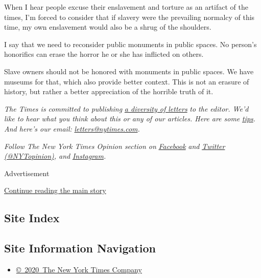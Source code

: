 When I hear people excuse their enslavement and torture as an artifact
of the times, I'm forced to consider that if slavery were the prevailing
normalcy of this time, my own enslavement would also be a shrug of the
shoulders.

I say that we need to reconsider public monuments in public spaces. No
person's honorifics can erase the horror he or she has inflicted on
others.

Slave owners should not be honored with monuments in public spaces. We
have museums for that, which also provide better context. This is not an
erasure of history, but rather a better appreciation of the horrible
truth of it.

\emph{The Times is committed to publishing}
\href{https://www.nytimes.com/2019/01/31/opinion/letters/letters-to-editor-new-york-times-women.html}{\emph{a
diversity of letters}} \emph{to the editor. We'd like to hear what you
think about this or any of our articles. Here are some}
\href{https://help.nytimes.com/hc/en-us/articles/115014925288-How-to-submit-a-letter-to-the-editor}{\emph{tips}}\emph{.
And here's our email:}
\href{mailto:letters@nytimes.com}{\emph{letters@nytimes.com}}\emph{.}

\emph{Follow The New York Times Opinion section on}
\href{https://www.facebook.com/nytopinion}{\emph{Facebook}} \emph{and}
\href{http://twitter.com/NYTOpinion}{\emph{Twitter
(@NYTopinion)}}\emph{, and}
\href{https://www.instagram.com/nytopinion/}{\emph{Instagram}}\emph{.}

Advertisement

\protect\hyperlink{after-bottom}{Continue reading the main story}

\hypertarget{site-index}{%
\subsection{Site Index}\label{site-index}}

\hypertarget{site-information-navigation}{%
\subsection{Site Information
Navigation}\label{site-information-navigation}}

\begin{itemize}
\tightlist
\item
  \href{https://help.nytimes.com/hc/en-us/articles/115014792127-Copyright-notice}{©~2020~The
  New York Times Company}
\end{itemize}


